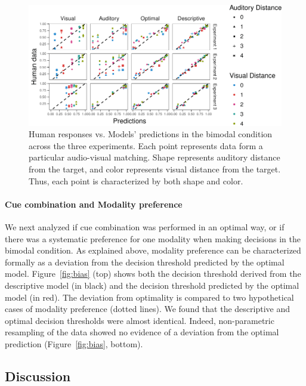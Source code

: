 \documentclass[english,floatsintext,man]{apa6}
\theoremstyle{definition}
\theoremstyle{definition}
\theoremstyle{definition}
\theoremstyle{remark}
\begin{document}
\begin{figure}[!h]
\includegraphics[width=\textwidth]{ms_files/figure-latex/bimodal-1} \caption{Human responses vs. Models' predictions in the bimodal condition across the three experiments. Each point represents data form a particular audio-visual matching. Shape represents auditory distance from the target, and color represents visual distance from the target. Thus, each point is characterized by both  shape and color.}\label{fig:bimodal}
\end{figure}

\paragraph{Cue combination and Modality
preference}\label{cue-combination-and-modality-preference}

We next analyzed if cue combination was performed in an optimal way, or
if there was a systematic preference for one modality when making
decisions in the bimodal condition. As explained above, modality
preference can be characterized formally as a deviation from the
decision threshold predicted by the optimal model. Figure~\ref{fig:bias}
(top) shows both the decision threshold derived from the descriptive
model (in black) and the decision threshold predicted by the optimal
model (in red). The deviation from optimality is compared to two
hypothetical cases of modality preference (dotted lines). We found that
the descriptive and optimal decision thresholds were almost identical.
Indeed, non-parametric resampling of the data showed no evidence of a
deviation from the optimal prediction (Figure~\ref{fig:bias}, bottom).

\subsection{Discussion}\label{discussion}
\end{document}
